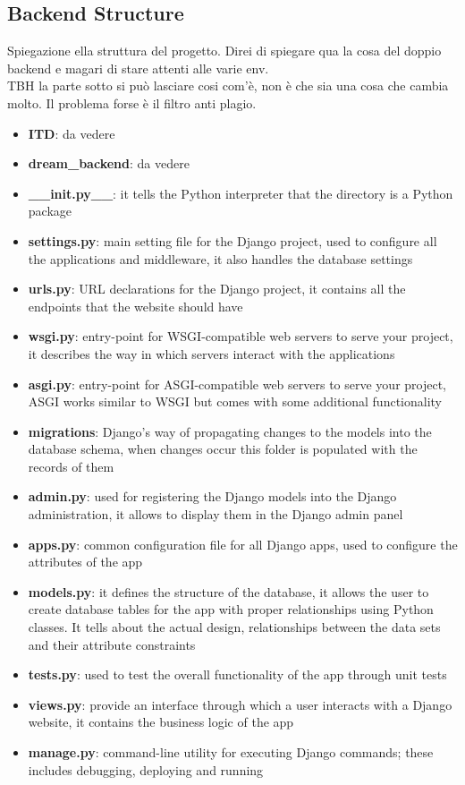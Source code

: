 \documentclass[table, 12pt]{article}
\begin{document}
\subsection{Backend Structure}
Spiegazione ella struttura del progetto. Direi di spiegare qua la cosa del doppio backend e magari di stare attenti alle varie env.\\
TBH la parte sotto si può lasciare cosi com'è, non è che sia una cosa che cambia molto. Il problema forse è il filtro anti plagio.
\begin{itemize}
    \item \textbf{ITD}: da vedere
    \item \textbf{dream\_backend}: da vedere
    \item \textbf{\_\_init.py\_\_}: it tells the Python interpreter that the directory is a Python package
    \item \textbf{settings.py}: main setting file for the Django project, used to configure all the applications and middleware, it also handles the database settings
    \item \textbf{urls.py}: URL declarations for the Django project, it contains all the endpoints that the website should have
    \item \textbf{wsgi.py}: entry-point for WSGI-compatible web servers to serve your project, it describes the way in which servers interact with the applications
    \item \textbf{asgi.py}: entry-point for ASGI-compatible web servers to serve your project, ASGI works similar to WSGI but comes with some additional functionality
    \item \textbf{migrations}: Django's way of propagating changes to the models into the database schema, when changes occur this folder is populated with the records of them
    \item \textbf{admin.py}: used for registering the Django models into the Django administration, it allows to display them in the Django admin panel
    \item \textbf{apps.py}: common configuration file for all Django apps, used to configure the attributes of the app
    \item \textbf{models.py}: it defines the structure of the database, it allows the user to create database tables for the app with proper relationships using Python classes. It tells about the actual design, relationships between the data sets and their attribute constraints
    \item \textbf{tests.py}: used to test the overall functionality of the app through unit tests
    \item \textbf{views.py}: provide an interface through which a user interacts with a Django website, it contains the business logic of the app
    \item \textbf{manage.py}: command-line utility for executing Django commands; these includes debugging, deploying and running
\end{itemize}
\end{document}
